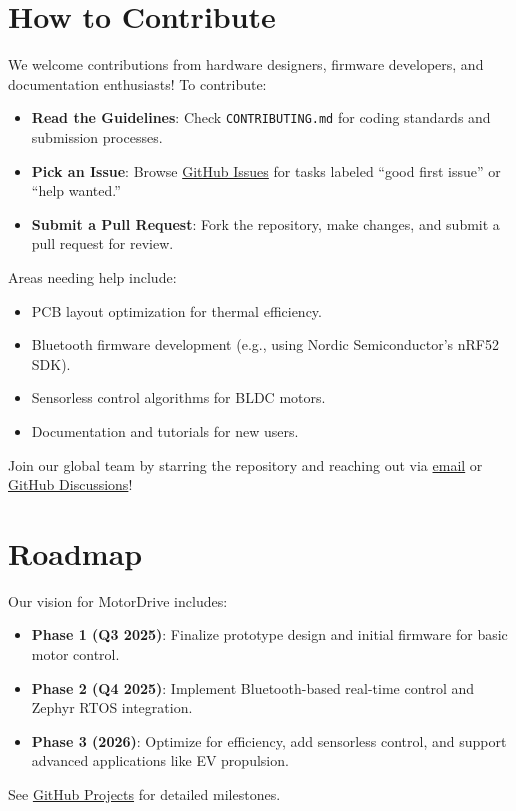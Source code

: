 \documentclass[11pt]{article}
\begin{document}
\section{How to Contribute}
We welcome contributions from hardware designers, firmware developers, and documentation enthusiasts! To contribute:
\begin{itemize}
    \item \textbf{Read the Guidelines}: Check \texttt{CONTRIBUTING.md} for coding standards and submission processes.
    \item \textbf{Pick an Issue}: Browse \href{https://github.com/cydrollinger1968/MotorDrive/issues}{GitHub Issues} for tasks labeled ``good first issue'' or ``help wanted.''
    \item \textbf{Submit a Pull Request}: Fork the repository, make changes, and submit a pull request for review.
\end{itemize}
Areas needing help include:
\begin{itemize}
    \item PCB layout optimization for thermal efficiency.
    \item Bluetooth firmware development (e.g., using Nordic Semiconductor's nRF52 SDK).
    \item Sensorless control algorithms for BLDC motors.
    \item Documentation and tutorials for new users.
\end{itemize}
Join our global team by starring the repository and reaching out via \href{mailto:cydrollinger@gmail.com}{email} or \href{https://github.com/cydrollinger1968/MotorDrive/discussions}{GitHub Discussions}!

\section{Roadmap}
Our vision for MotorDrive includes:
\begin{itemize}
    \item \textbf{Phase 1 (Q3 2025)}: Finalize prototype design and initial firmware for basic motor control.
    \item \textbf{Phase 2 (Q4 2025)}: Implement Bluetooth-based real-time control and Zephyr RTOS integration.
    \item \textbf{Phase 3 (2026)}: Optimize for efficiency, add sensorless control, and support advanced applications like EV propulsion.
\end{itemize}
See \href{https://github.com/cydrollinger1968/MotorDrive/projects}{GitHub Projects} for detailed milestones.
\end{document}
